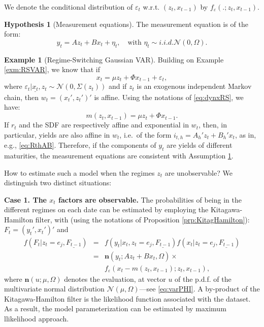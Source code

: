 \documentclass[
  12pt,
]{book}
\theoremstyle{definition}
\theoremstyle{definition}
\newtheorem{example}{Example}[chapter]
\theoremstyle{definition}
\theoremstyle{definition}
\newtheorem{hypothesis}{Hypothesis}[chapter]
\theoremstyle{remark}
\begin{document}
We denote the conditional distribution of \(\varepsilon_t\) w.r.t. \((z_t,x_{t-1})\) by \(f_{\varepsilon}(.;z_t,x_{t-1})\).

\begin{hypothesis}[Measurement equations]
\protect\hypertarget{hyp:RSmeasurement}{}\label{hyp:RSmeasurement}The measurement equation is of the form:
\begin{equation}
y_t = A z_t + B x_t + \eta_t,  \quad \mbox{with }  \eta_t \sim i.i.d. \mathcal{N}(0,\Omega).\label{eq:RSmeasur}
\end{equation}
\end{hypothesis}

\begin{example}[Regime-Switching Gaussian VAR]
\protect\hypertarget{exm:GRSVAR}{}\label{exm:GRSVAR}Building on Example \ref{exm:RSVAR}, we know that if
\begin{equation}
x_t = \mu z_t + \Phi x_{t-1} +  \varepsilon_t,\label{eq:xRSVAR}
\end{equation}
where \(\varepsilon_t|\underline{x_t},z_t \sim \mathcal{N}(0,\Sigma(z_t))\) and if \(z_t\) is an exogenous independent Markov chain, then \(w_t = (x_t',z_t')'\) is affine. Using the notations of \eqref{eq:dynxRS}, we have:
\[
m(z_t,x_{t-1}) = \mu z_t + \Phi x_{t-1}.
\]
If \(r_t\) and the SDF are respectively affine and exponential in \(w_t\), then, in particular, yields are also affine in \(w_t\), i.e.~of the form \(i_{t,h}= A_h'z_t + B_{h}'x_t\), as in, e.g., \eqref{eq:RthAB}. Therefore, if the components of \(y_t\) are yields of different maturities, the measurement equations are consistent with Assumption \ref{hyp:RSmeasurement}.
\end{example}

How to estimate such a model when the regimes \(z_t\) are unobservable? We distinguish two distinct situations:

\textbf{Case 1. The \(x_t\) factors are observable.} The probabilities of being in the different regimes on each date can be estimated by employing the Kitagawa-Hamilton filter, with (using the notations of Proposition \ref{prp:KitagHamilton}): \(F_t = (y_t',x_t')'\) and
\begin{eqnarray*}
f(F_t|z_t=e_j,\underline{F_{t-1}}) &=& f(y_t|x_t,z_t=e_j,\underline{F_{t-1}})f(x_t|z_t=e_j,\underline{F_{t-1}}) \\
&=& \mathbf{n}(y_t;A z_t + B x_t,\Omega) \times \\
&&f_{\varepsilon}(x_t - m(z_t,x_{t-1});z_t,x_{t-1}),
\end{eqnarray*}
where \(\mathbf{n}(u;\mu,\Omega)\) denotes the evaluation, at vector \(u\) of the p.d.f. of the multivariate normal distribution \(\mathcal{N}(\mu,\Omega)\)---see \eqref{eq:varPHI}. A by-product of the Kitagawa-Hamilton filter is the likelihood function associated with the dataset. As a result, the model parameterization can be estimated by maximum llikelihood approach.
\end{document}
